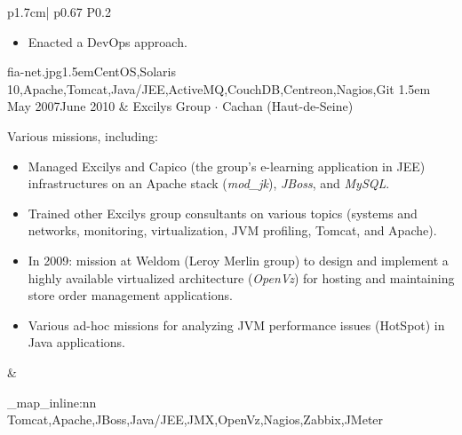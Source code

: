 \documentclass[darkhipster]{hipstercv}
\newcommand{\cvtags}[1] {
	\clist_map_inline:nn { #1 }
	{
		\cvtag{##1} %
	}
}
\newcommand{\cveventdetailed}[9]{
	{\small #1} & 
	{#2 $\cdot$ \small{{#4 ~\faMapMarker}}}\vspace{.5em}\newline
	{\color{black!70}\footnotesize #5\vspace{#9}} &
	{\raisebox{-0.7\height}{\texttt{[image: \#6]}}} \vspace{#7}
	{\par \small \cvtags{#8}}
}
\begin{document}
\begin{longtable}{p{1.7cm}| p{} P{0.2\textwidth}}
{\begin{itemize}
				\item Enacted a DevOps approach.
			\end{itemize}
		}
		{fia-net.jpg}{1.5em}{CentOS,Solaris 10,Apache,Tomcat,Java/JEE,ActiveMQ,CouchDB,Centreon,Nagios,Git}
		{1.5em} \\
	\cveventdetailed
		{May 2007\newline June 2010}
		{Excilys Group}
		{SRE/Architect}
		{Cachan (Haut-de-Seine)\color{cvred}}
		{
			Various missions, including:
			\begin{itemize}
				\item Managed Excilys and Capico (the group's e-learning application in JEE) infrastructures on an Apache stack (\emph{mod\_jk}), \emph{JBoss}, and \emph{MySQL}.
				\item Trained other Excilys group consultants on various topics (systems and networks, monitoring, virtualization, JVM profiling, Tomcat, and Apache).
				\item In 2009: mission at Weldom (Leroy Merlin group) to design and implement a highly available virtualized architecture (\emph{OpenVz}) for hosting and maintaining store order management applications.
				\item Various ad-hoc missions for analyzing JVM performance issues (HotSpot) in Java applications.
			\end{itemize}
		}
		{excilys.png}{0em}{Tomcat,Apache,JBoss,Java/JEE,JMX,OpenVz,Nagios,Zabbix,JMeter}
		{0em} \\
\end{longtable}
\end{document}
